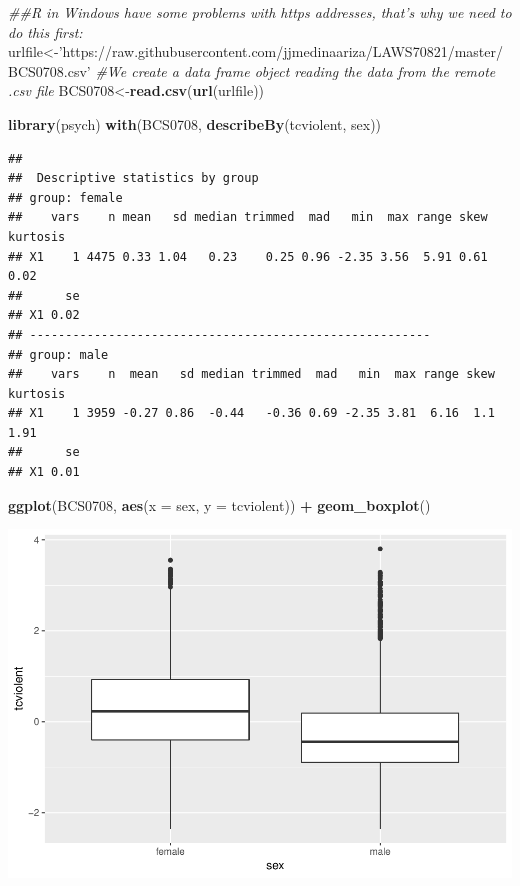 \documentclass[]{book}
\newenvironment{Shaded}{\begin{snugshade}}{\end{snugshade}}
\newcommand{\CommentTok}[1]{\textcolor[rgb]{0.56,0.35,0.01}{\textit{#1}}}
\newcommand{\DataTypeTok}[1]{\textcolor[rgb]{0.13,0.29,0.53}{#1}}
\newcommand{\KeywordTok}[1]{\textcolor[rgb]{0.13,0.29,0.53}{\textbf{#1}}}
\newcommand{\NormalTok}[1]{#1}
\newcommand{\OperatorTok}[1]{\textcolor[rgb]{0.81,0.36,0.00}{\textbf{#1}}}
\newcommand{\StringTok}[1]{\textcolor[rgb]{0.31,0.60,0.02}{#1}}
\theoremstyle{definition}
\theoremstyle{definition}
\theoremstyle{definition}
\theoremstyle{remark}
\begin{document}
\begin{Shaded}
\begin{Highlighting}[]
\CommentTok{##R in Windows have some problems with https addresses, that's why we need to do this first:}
\NormalTok{urlfile<-}\StringTok{'https://raw.githubusercontent.com/jjmedinaariza/LAWS70821/master/BCS0708.csv'}
\CommentTok{#We create a data frame object reading the data from the remote .csv file}
\NormalTok{BCS0708<-}\KeywordTok{read.csv}\NormalTok{(}\KeywordTok{url}\NormalTok{(urlfile))}
\end{Highlighting}
\end{Shaded}

\begin{Shaded}
\begin{Highlighting}[]
\KeywordTok{library}\NormalTok{(psych)}
\KeywordTok{with}\NormalTok{(BCS0708, }\KeywordTok{describeBy}\NormalTok{(tcviolent, sex))}
\end{Highlighting}
\end{Shaded}

\begin{verbatim}
## 
##  Descriptive statistics by group 
## group: female
##    vars    n mean   sd median trimmed  mad   min  max range skew kurtosis
## X1    1 4475 0.33 1.04   0.23    0.25 0.96 -2.35 3.56  5.91 0.61     0.02
##      se
## X1 0.02
## -------------------------------------------------------- 
## group: male
##    vars    n  mean   sd median trimmed  mad   min  max range skew kurtosis
## X1    1 3959 -0.27 0.86  -0.44   -0.36 0.69 -2.35 3.81  6.16  1.1     1.91
##      se
## X1 0.01
\end{verbatim}

\begin{Shaded}
\begin{Highlighting}[]
\KeywordTok{ggplot}\NormalTok{(BCS0708, }\KeywordTok{aes}\NormalTok{(}\DataTypeTok{x =}\NormalTok{ sex, }\DataTypeTok{y =}\NormalTok{ tcviolent)) }\OperatorTok{+}
\StringTok{  }\KeywordTok{geom_boxplot}\NormalTok{()}
\end{Highlighting}
\end{Shaded}

\includegraphics{05-inference_files/figure-latex/unnamed-chunk-41-1.pdf}
\end{document}
